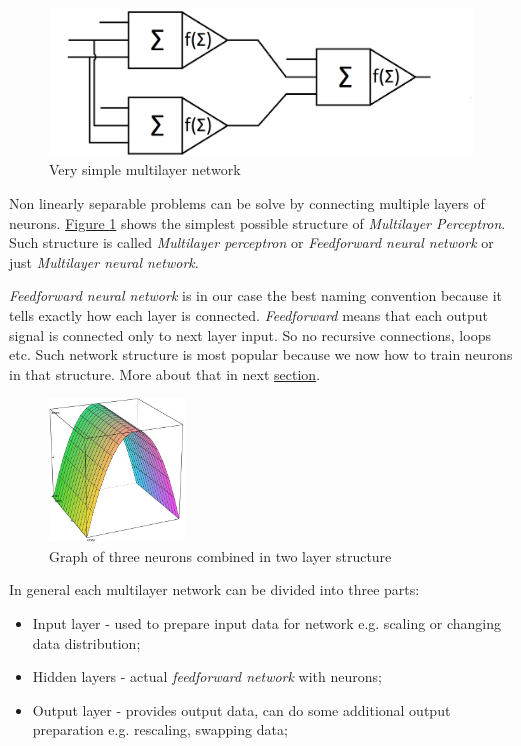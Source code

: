 \begin{figure}[!h]
    \centering
    \includegraphics[scale=0.2]{Media/MLN.png}
    \caption[Multilayer network]{Very simple multilayer network}
    \label{fig:MLN}
\end{figure}

Non linearly separable problems can be solve by connecting multiple layers of neurons. \hyperref[fig:MLN]{Figure \ref{fig:MLN}} shows the simplest possible structure of \textit{Multilayer Perceptron}. Such structure is called \textit{Multilayer perceptron} or \textit{Feedforward neural network} or just \textit{Multilayer neural network}.

\textit{Feedforward neural network} is in our case the best naming convention because it tells exactly how each layer is connected. \textit{Feedforward} means that each output signal is connected only to next layer input. So no recursive connections, loops etc. Such network structure is most popular because we now how to train neurons in that structure. More about that in next \hyperref[sec:Training]{section}.

\begin{figure}
    \includegraphics[width=0.32\textwidth]{Media/Bridge.png}
    \caption{Graph of three neurons combined in two layer structure}
    \label{fig:BridgeGraph}
\end{figure}

In general each multilayer network can be divided into three parts:
\begin{itemize}
    \item Input layer - used to prepare input data for network e.g. scaling or changing data distribution;
    \item Hidden layers - actual \textit{feedforward network} with neurons; 
    \item Output layer - provides output data, can do some additional output preparation e.g. rescaling, swapping data;
\end{itemize}

